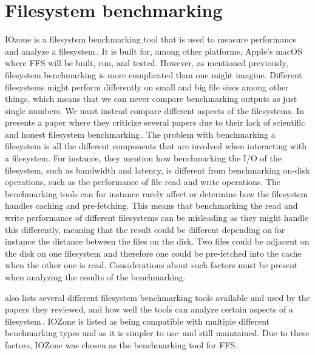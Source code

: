 \section{Filesystem benchmarking}
\label{sec:iozone}
IOzone is a filesystem benchmarking tool that is used to measure performance and analyze a filesystem\,\cite{IozoneFilesystemBenchmark}. It is built for, among other platforms, Apple's macOS where \gls{FFS} will be built, run, and tested. However, as mentioned previously, filesystem benchmarking is more complicated than one might imagine. Different filesystems might perform differently on small and big file sizes among other things, which means that we can never compare benchmarking outputs as just single numbers. We must instead compare different aspects of the filesystems. In \citeyear{tarasovBenchmarkingFileSystem2011} \citeauthor{tarasovBenchmarkingFileSystem2011} presents a paper where they criticize several papers due to their lack of scientific and honest filesystem benchmarking\,\cite{tarasovBenchmarkingFileSystem2011}. The problem with benchmarking a filesystem is all the different components that are involved when interacting with a filesystem. For instance, they mention how benchmarking the \gls{I/O} of the filesystem, such as bandwidth and latency, is different from benchmarking \mbox{on-disk} operations, such as the performance of file read and write operations. The benchmarking tools can for instance rarely affect or determine how the filesystem handles caching and \mbox{pre-fetching}. This means that benchmarking the read and write performance of different filesystems can be misleading as they might handle this differently, meaning that the result could be different depending on for instance the distance between the files on the disk. Two files could be adjacent on the disk on one filesystem and therefore one could be \mbox{pre-fetched} into the cache when the other one is read. Considerations about such factors must be present when analyzing the results of the benchmarking.

\citeauthor{tarasovBenchmarkingFileSystem2011} also lists several different filesystem benchmarking tools available and used by the papers they reviewed, and how well the tools can analyze certain aspects of a filesystem\,\cite{tarasovBenchmarkingFileSystem2011}. IOZone is listed as being compatible with multiple different benchmarking types and as it is simpler to use\,\cite{agarwalComparingIOBenchmarks2018} and still maintained. Due to these factors, IOZone was chosen as the benchmarking tool for \gls{FFS}.